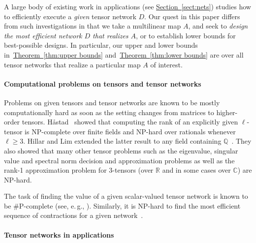 \documentclass[11pt]{article}
\numberwithin{equation}{section}
\theoremstyle{definition}
\theoremstyle{plain}
\newcommand{\eg}{e.\,g.}
\newcommand{\expref}[2]{\hyperref[#2]{#1~\ref{#2}}}
\begin{document}
A large body of existing work in applications
(see \expref{Section}{sect:nets}) %
studies
how to efficiently execute a \emph{given} tensor network $D$.
Our quest in this paper differs from such
%
investigations  %
in that
we %
take  %
a multilinear map $A$, and seek to
\emph{design the most efficient network $D$ that realizes $A$},
or to establish lower bounds for best-possible designs.
In particular, our upper and lower bounds in~\expref{Theorem}{thm:upper bounds}
and~\expref{Theorem}{thm:lower bounds} are over all tensor networks that 
realize a particular map $A$ of interest.

\paragraph*{Computational problems on tensors and tensor networks}

Problems on given tensors and tensor networks are known to be mostly
computationally hard as soon as the setting changes from matrices to
higher-order tensors.
H\aa{}stad~\cite{Hastad1990} showed that computing the rank of
an explicitly given $\ell$-tensor is NP-complete over finite fields
and NP-hard over rationals whenever $\ell\geq 3$. Hillar and Lim extended the latter result to any field containing $\mathbb{Q}$~\cite{HillarL2013}. They also showed that many other tensor problems such as the eigenvalue, singular value and spectral norm decision and approximation problems as well as
the  %
rank-1 approximation problem for 3-tensors (over $\mathbb{R}$ and in some cases over $\mathbb{C}$) are NP-hard.

The task of finding the value of a given scalar-valued tensor network
is known to be $\#$P-complete (see, \eg, 
\cite{BacchusDP2003,BiamonteMT2015}).
Similarly, it is NP-hard to find the most efficient sequence of contractions
for a given network~\cite{LamSW1997,PfeiferHV2014}.

\paragraph*{Tensor networks in applications}
\end{document}

